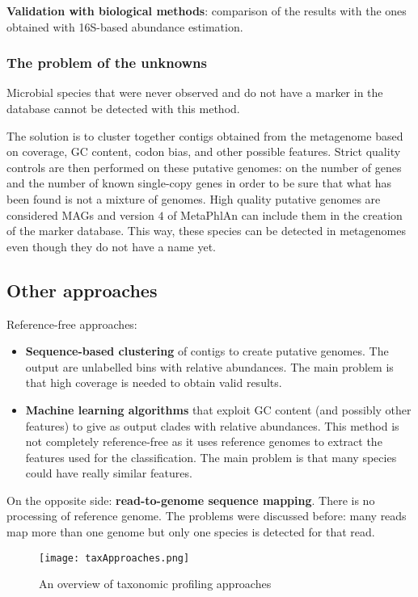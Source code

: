 \textbf{Validation with biological methods}: comparison of the results with the ones obtained with 16S-based abundance estimation.

\subsubsection{The problem of the unknowns}

Microbial species that were never observed and do not have a marker in the database cannot be detected with this method.

The solution is to cluster together contigs obtained from the metagenome based on coverage, GC content, codon bias, and other possible features. Strict quality controls are then performed on these putative genomes: on the number of genes and the number of known single-copy genes in order to be sure that what has been found is not a mixture of genomes. High quality putative genomes are considered MAGs and version $4$ of MetaPhlAn can include them in the creation of the marker database. This way, these species can be detected in metagenomes even though they do not have a name yet.

\subsection{Other approaches}

Reference-free approaches:
\begin{itemize}
    \item \textbf{Sequence-based clustering} of contigs to create putative genomes. The output are unlabelled bins with relative abundances. The main problem is that high coverage is needed to obtain valid results.
    \item \textbf{Machine learning algorithms} that exploit GC content (and possibly other features) to give as output clades with relative abundances. This method is not completely reference-free as it uses reference genomes to extract the features used for the classification. The main problem is that many species could have really similar features.
\end{itemize}

On the opposite side: \textbf{read-to-genome sequence mapping}. There is no processing of reference genome. The problems were discussed before: many reads map more than one genome but only one species is detected for that read.

\begin{figure}[!h]
\centering
\texttt{[image: taxApproaches.png]}
\caption{\label{fig:taxApproaches}An overview of taxonomic profiling approaches}
\end{figure}

